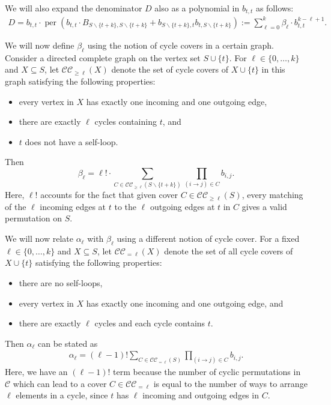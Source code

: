 \documentclass[11pt]{article}
\makeatletter
\theoremstyle{definition}
\newenvironment{proof}[1][\protect\proofname]{\par
	\normalfont\topsep6\p@\@plus6\p@\relax
	\trivlist
	\itemindent\parindent        %
	\item[\hskip\labelsep\scshape #1]\ignorespaces
}{%
	\endtrivlist\@endpefalse
}
\providecommand{\proofname}{Proof}
\DeclareMathOperator{\per}{per}
\makeatother
\begin{document}
\begin{proof}
We will also expand the denominator $D$ also as a polynomial in $b_{t,t}$ as follows:
 \begin{align*}
        D = b_{t,t} \cdot \per\left(b_{t,t} \cdot B_{S\backslash \{t+k\}, S \backslash \{t+k\}} +b_{S\backslash \{t+k\}, t} b_{t, S\backslash \{t+k\}} \right) := \sum_{\ell = 0}^k \beta_\ell \cdot b_{t,t}^{k-\ell +1}.
    \end{align*}

    We will now define $\beta_{\ell}$ using the notion of cycle covers in a certain graph. 
    Consider a directed complete graph on the vertex set $S \cup \{t\}$. For $\ell \in \{0, \ldots, k\}$ and $X \subseteq S$, let $\mathcal{CC}_{\geq \ell}(X)$ denote the set of cycle covers of $X \cup \{t\}$ in this graph satisfying the following properties:
    \begin{itemize}
        \item every vertex in $X$  has exactly one incoming and one outgoing edge,
        \item there are exactly $\ell$ cycles containing $t$, and
        \item $t$ does not have a self-loop.
    \end{itemize}
    
    Then
    \begin{equation*}
        \beta_\ell = \ell! \cdot \sum_{C \in \mathcal{CC}_{\geq \ell}(S \backslash \{t+k\})} \prod_{(i\rightarrow j) \in C} b_{i,j}.
    \end{equation*}
    Here, $\ell!$ accounts for the fact that given cover $C \in \mathcal{CC}_{\geq \ell}(S)$, every matching of the $\ell$ incoming edges at $t$ to the $\ell$ outgoing edges at $t$ in $C$ gives a valid permutation on $S$.
    
    We will now relate $\alpha_\ell$ with $\beta_\ell$ using a different notion of cycle cover. For a fixed $\ell \in \{0, \ldots, k\}$ and $X \subseteq S$, let $\mathcal{CC}_{=\ell}(X)$ denote the set of all cycle covers of $X \cup \{t\} $ satisfying the following properties:
    \begin{itemize}
        \item there are no self-loops,
        \item every vertex in $X$ has exactly one incoming and one outgoing edge, and
        \item there are exactly $\ell$ cycles and each cycle contains $t$.
    \end{itemize}
    
    
  Then $ \alpha_{\ell}$ can be stated as
    \begin{align}
        \alpha_{\ell} = (\ell-1)!\sum_{C\in \mathcal{CC}_{=\ell}(S)} \prod_{(i\rightarrow j) \in C} b_{i,j} . \label{eq:alpha}
    \end{align}
    Here, we have an $(\ell-1)!$ term because the number of cyclic permutations in $\mathcal{C}$ which can lead to a cover $C \in \mathcal{CC}_{=\ell}$ is equal to the number of ways to arrange $\ell$ elements in a cycle, since $t$ has $\ell$ incoming and outgoing edges in $C$.


\end{proof}
\end{document}

